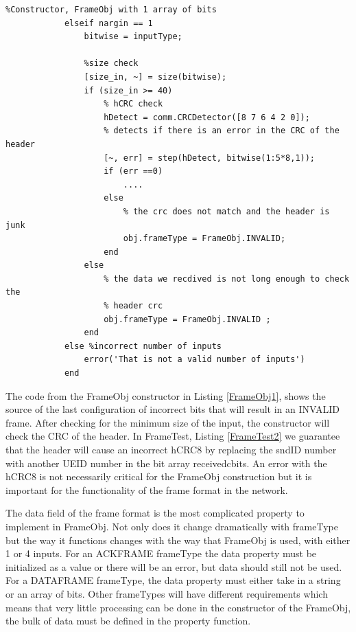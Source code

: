 \begin{lstlisting} 
%Constructor, FrameObj with 1 array of bits
            elseif nargin == 1
                bitwise = inputType;
                 
                %size check
                [size_in, ~] = size(bitwise);
                if (size_in >= 40)
                    % hCRC check
                    hDetect = comm.CRCDetector([8 7 6 4 2 0]);
                    % detects if there is an error in the CRC of the header
                    [~, err] = step(hDetect, bitwise(1:5*8,1));
                    if (err ==0)
						....
                    else
                        % the crc does not match and the header is junk
                        obj.frameType = FrameObj.INVALID;
                    end
                else
                    % the data we recdived is not long enough to check the
                    % header crc
                    obj.frameType = FrameObj.INVALID ;     
                end
            else %incorrect number of inputs
                error('That is not a valid number of inputs')
            end
\end{lstlisting} 

The code from the FrameObj constructor in Listing \ref{FrameObj1}, shows the source of the last configuration of incorrect bits that will result in an INVALID frame. After checking for the minimum size of the input, the constructor will check the CRC of the header. In FrameTest, Listing \ref{FrameTest2} we guarantee that the header will cause an incorrect hCRC8 by replacing the sndID number with another UEID number in the bit array receivedcbits. An error with the hCRC8 is not necessarily critical for the FrameObj construction but it is important for the functionality of the frame format in the network.

The data field of the frame format is the most complicated property to implement in FrameObj. Not only does it change dramatically with frameType but the way it functions changes with the way that FrameObj is used, with either 1 or 4 inputs. For an ACKFRAME frameType the data property must be initialized as a value or there will be an error, but data should still not be used. For a DATAFRAME frameType, the data property must either take in a string or an array of bits. Other frameTypes will have different requirements which means that very little processing can be done in the constructor of the FrameObj, the bulk of data must be defined in the property function. 

